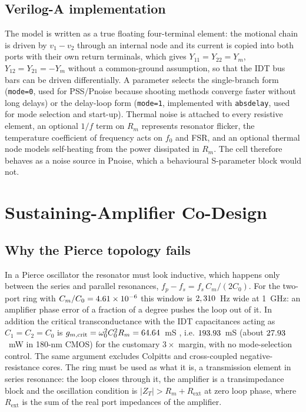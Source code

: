 \documentclass[journal]{IEEEtran}
\begin{document}
\subsection{Verilog-A implementation}
The model is written as a true floating four-terminal element: the motional chain is driven by $v_1-v_2$ through an internal node and its current is copied into both ports with their own return terminals, which gives $Y_{11}=Y_{22}=Y_m$, $Y_{12}=Y_{21}=-Y_m$ without a common-ground assumption, so that the IDT bus bars can be driven differentially. A parameter selects the single-branch form (\texttt{mode=0}, used for PSS/Pnoise because shooting methods converge faster without long delays) or the delay-loop form (\texttt{mode=1}, implemented with \texttt{absdelay}, used for mode selection and start-up). Thermal noise is attached to every resistive element, an optional $1/f$ term on $R_m$ represents resonator flicker, the temperature coefficient of frequency acts on $f_0$ and FSR, and an optional thermal node models self-heating from the power dissipated in $R_m$. The cell therefore behaves as a noise source in Pnoise, which a behavioural S-parameter block would not.

\section{Sustaining-Amplifier Co-Design}\label{sec:codesign}

\subsection{Why the Pierce topology fails}
In a Pierce oscillator the resonator must look inductive, which happens only between the series and parallel resonances, $f_p-f_s=f_s\,C_m/(2C_0)$. For the two-port ring with $C_m/C_0=4.61\times10^{-6}$ this window is $2,310$~Hz wide at 1~GHz: an amplifier phase error of a fraction of a degree pushes the loop out of it. In addition the critical transconductance with the IDT capacitances acting as $C_1=C_2=C_0$ is $g_{m,\mathrm{crit}}=\omega_0^2C_0^2R_m=64.64$~mS \cite{vittoz1988}, i.e. $193.93$~mS (about $27.93$~mW in 180-nm CMOS) for the customary $3\times$ margin, with no mode-selection control. The same argument excludes Colpitts and cross-coupled negative-resistance cores. The ring must be used as what it is, a transmission element in series resonance: the loop closes through it, the amplifier is a transimpedance block and the oscillation condition is $|Z_T|>R_m+R_{\mathrm{ext}}$ at zero loop phase, where $R_{\mathrm{ext}}$ is the sum of the real port impedances of the amplifier.
\end{document}
